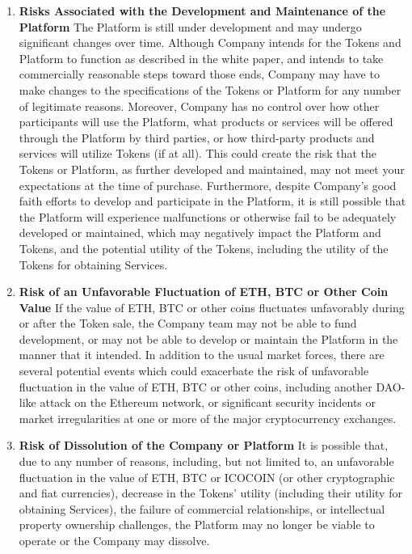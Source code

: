\begin{enumerate}
    \item \textbf{Risks Associated with the Development and Maintenance of the Platform}
    The Platform is still under development and may undergo significant changes over time. Although Company intends for the Tokens and Platform to function as described in the white paper, and intends to take commercially reasonable steps toward those ends, Company may have to make changes to the specifications of the Tokens or Platform for any number of legitimate reasons. Moreover, Company has no control over how other participants will use the Platform, what products or services will be offered through the Platform by third parties, or how third-party products and services will utilize Tokens (if at all). This could create the risk that the Tokens or Platform, as further developed and maintained, may not meet your expectations at the time of purchase. Furthermore, despite Company’s good faith efforts to develop and participate in the Platform, it is still possible that the Platform will experience malfunctions or otherwise fail to be adequately developed or maintained, which may negatively impact the Platform and Tokens, and the potential utility of the Tokens, including the utility of the Tokens for obtaining Services.
    
    \item \textbf{Risk of an Unfavorable Fluctuation of ETH, BTC or Other Coin Value} 
    If the value of ETH, BTC or other coins fluctuates unfavorably during or after the Token sale, the Company team may not be able to fund development, or may not be able to develop or maintain the Platform in the manner that it intended. In addition to the usual market forces, there are several potential events which could exacerbate the risk of unfavorable fluctuation in the value of ETH, BTC or other coins, including another DAO-like attack on the Ethereum network, or significant security incidents or market irregularities at one or more of the major cryptocurrency exchanges.
    
    \item \textbf{Risk of Dissolution of the Company or Platform}
    It is possible that, due to any number of reasons, including, but not limited to, an unfavorable fluctuation in the value of ETH, BTC or ICOCOIN (or other cryptographic and fiat currencies), decrease in the Tokens’ utility (including their utility for obtaining Services), the failure of commercial relationships, or intellectual property ownership challenges, the Platform may no longer be viable to operate or the Company may dissolve.
    

\end{enumerate}
